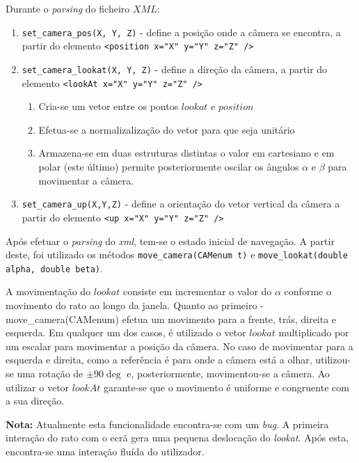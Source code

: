 \documentclass[runningheads]{llncs}
\begin{document}
Durante o \textit{parsing} do ficheiro $XML$:
\begin{enumerate}
    \item \texttt{set_camera_pos(X, Y, Z)} - define a posição onde a câmera se encontra,
    a partir do elemento \texttt{<position x="X" y="Y" z="Z" />}
    \item \texttt{set_camera_lookat(X, Y, Z)} - define a direção da câmera,
    a partir do elemento \texttt{<lookAt x="X" y="Y" z="Z" />}
    \begin{enumerate}
        \item Cria-se um vetor entre os pontos $lookat$ e $position$
        \item Efetua-se a normalizalização do vetor para que seja unitário
        \item Armazena-se em duas estruturas distintas o valor em cartesiano e em polar
        (este último) permite posteriormente oscilar os ângulos $\alpha$ e $\beta$ para movimentar a câmera.
    \end{enumerate}
    \item \texttt{set_camera_up(X,Y,Z)} - define a orientação do vetor vertical da câmera a partir do 
    elemento \texttt{<up x="X" y="Y" z="Z" />}
\end{enumerate}

Após efetuar o \textit{parsing} do \textit{xml}, tem-se o estado inicial de navegação.
A partir deste, foi utilizado os métodos \texttt{move_camera(CAMenum t)} e
\texttt{move_lookat(double alpha, double beta)}.

A movimentação do $lookat$ consiste em incrementar o valor do $\alpha$ conforme o movimento do 
rato ao longo da janela.
Quanto ao primeiro - move\_camera(CAMenum) efetua um movimento para a frente, trás, direita e esquerda.
Em qualquer um dos casos, é utilizado o vetor $lookat$ multiplicado por um escalar para movimentar a posição da câmera.
No caso de movimentar para a esquerda e direita, como a referência é para onde a câmera está a olhar,
utilizou-se uma rotação de $\pm90\deg$ e, posteriormente, movimentou-se a câmera.
Ao utilizar o vetor $lookAt$ garante-se que o movimento é uniforme e congruente com a sua direção.

\textbf{Nota:} Atualmente esta funcionalidade encontra-se com um 
\textit{bug}. A primeira interação do rato com o ecrã gera uma pequena 
deslocação do \textit{lookat}. 
Após esta, encontra-se uma interação fluída do utilizador.
\end{document}
